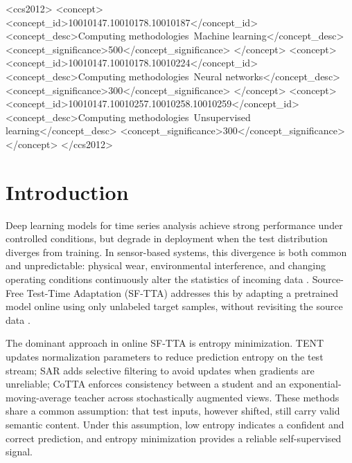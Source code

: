 \documentclass[sigconf, screen, review, anonymous]{acmart}
\theoremstyle{plain}
\theoremstyle{definition}
\theoremstyle{remark}
\begin{document}
\begin{CCSXML}
<ccs2012>
 <concept>
  <concept_id>10010147.10010178.10010187</concept_id>
  <concept_desc>Computing methodologies~Machine learning</concept_desc>
  <concept_significance>500</concept_significance>
 </concept>
 <concept>
  <concept_id>10010147.10010178.10010224</concept_id>
  <concept_desc>Computing methodologies~Neural networks</concept_desc>
  <concept_significance>300</concept_significance>
 </concept>
 <concept>
  <concept_id>10010147.10010257.10010258.10010259</concept_id>
  <concept_desc>Computing methodologies~Unsupervised learning</concept_desc>
  <concept_significance>300</concept_significance>
 </concept>
</ccs2012>
\end{CCSXML}



\maketitle

\section{Introduction}
\label{sec:intro}

Deep learning models for time series analysis achieve strong performance
under controlled conditions, but degrade in deployment when the test
distribution diverges from training. In sensor-based systems, this
divergence is both common and unpredictable: physical wear, environmental
interference, and changing operating conditions continuously alter the
statistics of incoming data \citep{wu2023timesnet,yue2022ts2vec}.
Source-Free Test-Time Adaptation (SF-TTA) addresses this by adapting a
pretrained model online using only unlabeled target samples, without
revisiting the source data \citep{liang2020shot}.

The dominant approach in online SF-TTA is entropy minimization. TENT
\citep{wang2021tent} updates normalization parameters to reduce prediction
entropy on the test stream; SAR \citep{niu2023sar} adds selective
filtering to avoid updates when gradients are unreliable; CoTTA
\citep{wang2022cotta} enforces consistency between a student and an
exponential-moving-average teacher across stochastically augmented views.
These methods share a common assumption: that test inputs, however shifted,
still carry valid semantic content. Under this assumption, low entropy
indicates a confident and correct prediction, and entropy minimization
provides a reliable self-supervised signal.
\end{document}

